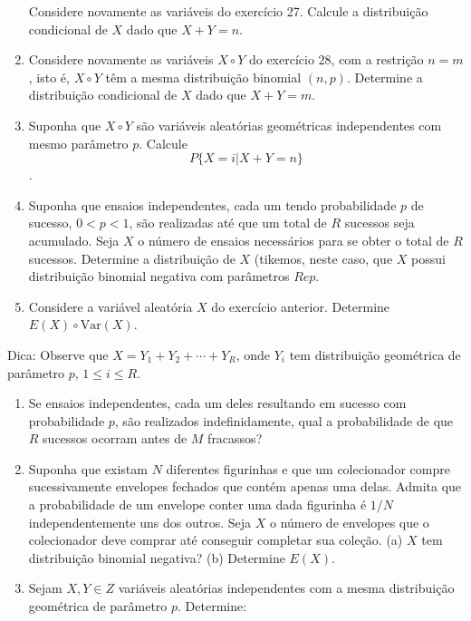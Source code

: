 \documentclass[
  10pt,
]{article}
\begin{document}
\begin{enumerate}
  Considere novamente as variáveis do exercício 27. Calcule a
  distribuição condicional de \(X\) dado que \(X + Y = n\).
\item
  Considere novamente as variáveis \(X \circ Y\) do exercício 28, com a
  restrição \(n = m\), isto é, \(X \circ Y\) têm a mesma distribuição
  binomial \((n, p)\). Determine a distribuição condicional de \(X\)
  dado que \(X + Y = m\).
\item
  Suponha que \(X \circ Y\) são variáveis aleatórias geométricas
  independentes com mesmo parâmetro \(p\). Calcule
  \[ P\{X = i|X + Y = n\} \].
\item
  Suponha que ensaios independentes, cada um tendo probabilidade \(p\)
  de sucesso, \(0 < p < 1\), são realizadas até que um total de \(R\)
  sucessos seja acumulado. Seja \(X\) o número de ensaios necessários
  para se obter o total de \(R\) sucessos. Determine a distribuição de
  \(X\) (tikemos, neste caso, que \(X\) possui distribuição binomial
  negativa com parâmetros \(R e p\).
\item
  Considere a variável aleatória \(X\) do exercício anterior. Determine
  \(E(X) \circ \text{Var}(X)\).
\end{enumerate}

Dica: Observe que \(X = Y_1 + Y_2 + \cdots + Y_R\), onde \(Y_i\) tem
distribuição geométrica de parâmetro \(p\), \(1 \leq i \leq R\).

\begin{enumerate}
\def\labelenumi{\arabic{enumi}.}
\setcounter{enumi}{33}
\item
  Se ensaios independentes, cada um deles resultando em sucesso com
  probabilidade \(p\), são realizados indefinidamente, qual a
  probabilidade de que \(R\) sucessos ocorram antes de \(M\) fracassos?
\item
  Suponha que existam \(N\) diferentes figurinhas e que um colecionador
  compre sucessivamente envelopes fechados que contém apenas uma delas.
  Admita que a probabilidade de um envelope conter uma dada figurinha é
  \(1/N\) independentemente uns dos outros. Seja \(X\) o número de
  envelopes que o colecionador deve comprar até conseguir completar sua
  coleção. (a) \(X\) tem distribuição binomial negativa? (b) Determine
  \(E(X)\).
\item
  Sejam \(X, Y \in Z\) variáveis aleatórias independentes com a mesma
  distribuição geométrica de parâmetro \(p\). Determine:\\
\end{enumerate}
\end{document}
